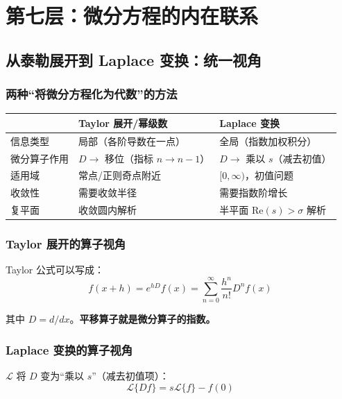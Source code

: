 \section{第七层：微分方程的内在联系}

\subsection{从泰勒展开到 Laplace 变换：统一视角}

\subsubsection{两种“将微分方程化为代数”的方法}

\begin{center}
\begin{tabular}{L{2cm}L{5cm}L{5cm}}
\toprule
 & \textbf{Taylor 展开/幂级数} & \textbf{Laplace 变换} \\
\midrule
信息类型 & 局部（各阶导数在一点） & 全局（指数加权积分） \\
微分算子作用 & $D \to$ 移位（指标 $n \to n-1$） & $D \to$ 乘以 $s$（减去初值） \\
适用域 & 常点/正则奇点附近 & $[0,\infty)$，初值问题 \\
收敛性 & 需要收敛半径 & 需要指数阶增长 \\
复平面 & 收敛圆内解析 & 半平面 $\text{Re}(s) > \sigma$ 解析 \\
\bottomrule
\end{tabular}
\end{center}

\subsubsection{Taylor 展开的算子视角}

Taylor 公式可以写成：
\[
f(x + h) = e^{hD}f(x) = \sum_{n=0}^{\infty} \frac{h^n}{n!}D^n f(x)
\]

其中 $D = d/dx$。\textbf{平移算子就是微分算子的指数。}

\subsubsection{Laplace 变换的算子视角}

$\mathcal{L}$ 将 $D$ 变为“乘以 $s$”（减去初值项）：
\[
\mathcal{L}\{Df\} = s\mathcal{L}\{f\} - f(0)
\]

